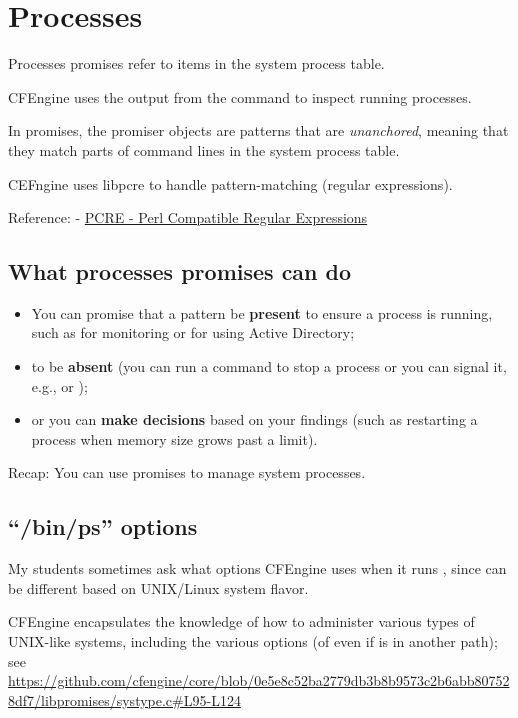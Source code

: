 \section{Processes}

Processes promises refer to items in the system process table.

CFEngine uses the output from the  command to inspect running
processes.

In  promises, the promiser objects are patterns that are
\emph{unanchored}, meaning that they match parts of command lines in the
system process table.

CEFngine uses libpcre to handle pattern-matching (regular expressions).

Reference:
- \href{https://www.pcre.org/}{PCRE - Perl Compatible Regular Expressions}





\subsection{What processes promises can do}

\begin{itemize}
\item{} You can promise that a pattern be \textbf{present} to ensure a process is
running, such as  for monitoring or  for using Active
Directory;
\item{} to be \textbf{absent} (you can run a command to stop a process or you can
signal it, e.g.,  or );
\item{} or you can \textbf{make decisions} based on your findings (such as restarting
a process when memory size grows past a limit).
\end{itemize}

Recap: You can use  promises to manage system processes.





\subsection{``/bin/ps'' options}

My students sometimes ask what options CFEngine uses when it runs
, since  can be different based on UNIX/Linux system
flavor.

CFEngine encapsulates the knowledge of how to administer various types
of UNIX-like systems, including the various  options (of even if
 is in another path); see
\href{https://github.com/cfengine/core/blob/0e5e8c52ba2779db3b8b9573c2b6abb807528df7/libpromises/systype.c#L95-L124}{https://github.com/cfengine/core/blob/0e5e8c52ba2779db3b8b9573c2b6abb807528df7/libpromises/systype.c\#L95-L124}

